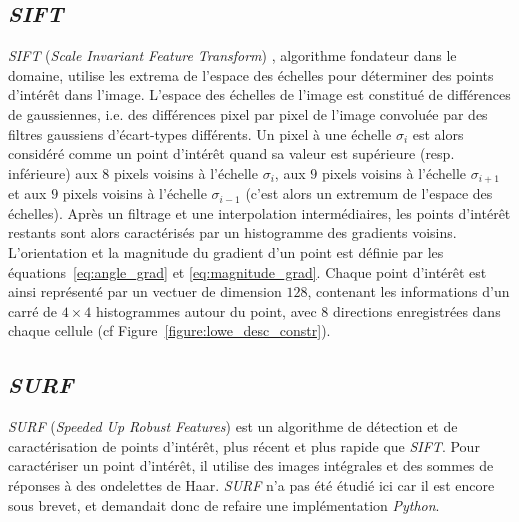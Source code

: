 \documentclass[
	a4paper, %
	10pt, %
	unnumberedsections, %
	twoside, %
]{LTJournalArticle}
\begin{document}
\subsection{\textit{SIFT}}

\textit{SIFT} (\textit{Scale Invariant Feature Transform}) \autocite{Lowe:2004}, algorithme fondateur dans le domaine, utilise les extrema de l'espace des échelles pour déterminer des points d'intérêt dans l'image.
L'espace des échelles de l'image est constitué de différences de gaussiennes, i.e. des différences pixel par pixel de l'image convoluée par des filtres gaussiens d'écart-types différents.
Un pixel à une échelle $\sigma_i$ est alors considéré comme un point d'intérêt quand sa valeur est supérieure (resp. inférieure) aux $8$ pixels voisins à l'échelle $\sigma_i$, aux $9$ pixels voisins à l'échelle $\sigma_{i+1}$ et aux $9$ pixels voisins à l'échelle $\sigma_{i-1}$
(c'est alors un extremum de l'espace des échelles).
Après un filtrage et une interpolation intermédiaires, les points d'intérêt restants sont alors caractérisés par un histogramme des gradients voisins.
L'orientation et la magnitude du gradient d'un point est définie par les équations~\ref{eq:angle_grad} et \ref{eq:magnitude_grad}.
Chaque point d'intérêt est ainsi représenté par un vectuer de dimension $128$, contenant les informations d'un carré de
$4 \times 4$ histogrammes autour du point, avec $8$ directions enregistrées dans chaque cellule (cf Figure~\ref{figure:lowe_desc_constr}).


\subsection{\textit{SURF}}

\textit{SURF} \autocite{SURF} (\textit{Speeded Up Robust Features}) est un algorithme de détection
et de caractérisation de points d'intérêt, plus récent et plus rapide que \textit{SIFT}.
Pour caractériser un point d'intérêt, il utilise des images intégrales et des sommes de réponses à des ondelettes de Haar.
\textit{SURF} n'a pas été étudié ici car il est encore sous brevet, et demandait donc de refaire une implémentation \textit{Python}.
\end{document}
